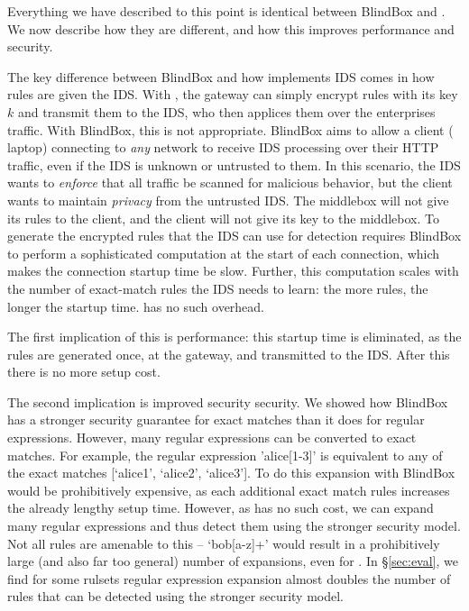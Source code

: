   Everything we have described to this point is identical between BlindBox and \sys. We now describe how they are different, and how this improves performance and security.

The key difference between BlindBox and how \sys implements IDS comes in how rules are given the IDS.
With \sys, the gateway can simply encrypt rules with its key $k$ and transmit them to the IDS, who then applices them over the enterprises traffic.
With BlindBox, this is not appropriate.
BlindBox aims to allow a client (\eg{} laptop) connecting to {\em any} network to receive IDS processing over their HTTP traffic, even if the IDS is unknown or untrusted to them.
In this scenario, the IDS wants to {\it enforce} that all traffic be scanned for malicious behavior, but the client wants to maintain {\it privacy} from the untrusted IDS.
The middlebox will not give its rules to the client, and the client will not give its key to the middlebox.
 To generate the encrypted rules that the IDS can use for detection requires BlindBox to perform
a sophisticated computation at the start of each connection, which makes the connection
startup time be slow. 
Further, this computation scales with the number of exact-match rules the IDS needs to learn: the more rules, the longer the startup time.
\sys has no such overhead.

The first implication of this is performance: this startup time is eliminated, as the rules are generated once, at the gateway, and transmitted to the IDS. After this there is no more setup cost.

The second implication is improved security security. We showed how BlindBox has a stronger security guarantee for exact matches than it does for regular expressions. However, many regular expressions can be converted to exact matches. 
For example, the regular expression 'alice[1-3]' is equivalent to any of the exact matches [`alice1', `alice2', `alice3'].
To do this expansion with BlindBox would be prohibitively expensive, as each additional exact match rules increases the already lengthy setup time.
However, as \sys has no such cost, we can expand many regular expressions and thus detect them using the stronger security model.
Not all rules are amenable to this -- \eg{} `bob[a-z]+' would result in a prohibitively large (and also far too general) number of expansions, even for \sys. 
In \S\ref{sec:eval}, we find for some rulsets regular expression expansion almost doubles the number of rules that can be detected using the stronger security model.


